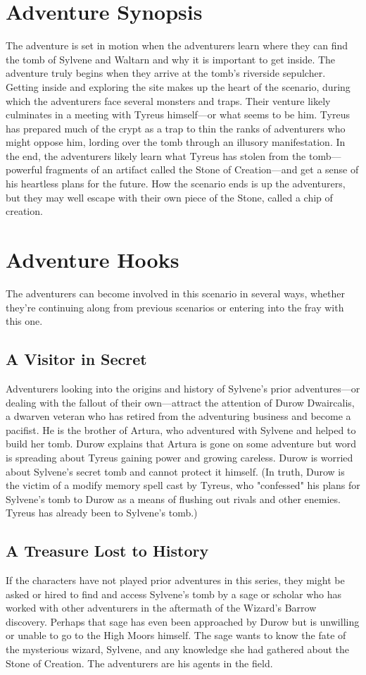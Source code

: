 \documentclass[10pt,a4paper,twoside,twocolumn,openany,bg=print,nodeprecatedcode]{dndbook}
\begin{document}
\section{Adventure Synopsis}
The adventure is set in motion when the adventurers learn where they can find the tomb of Sylvene and Waltarn and why it is important to get inside. The adventure truly begins when they arrive at the tomb's riverside sepulcher. Getting inside and exploring the site makes up the heart of the scenario, during which the adventurers face several monsters and traps. Their venture likely culminates in a meeting with Tyreus himself—or what seems to be him. Tyreus has prepared much of the crypt as a trap to thin the ranks of adventurers who might oppose him, lording over the tomb through an illusory manifestation. In the end, the adventurers likely learn what Tyreus has stolen from the tomb—powerful fragments of an artifact called the Stone of Creation—and get a sense of his heartless plans for the future.
How the scenario ends is up the adventurers, but they may well escape with their own piece of the Stone, called a chip of creation.
\section{Adventure Hooks}
The adventurers can become involved in this scenario in several ways, whether they're continuing along from previous scenarios or entering into the fray with this one.
\subsection{A Visitor in Secret}
Adventurers looking into the origins and history of Sylvene's prior adventures—or dealing with the fallout of their own—attract the attention of Durow Dwaircalis, a dwarven veteran who has retired from the adventuring business and become a pacifist. He is the brother of Artura, who adventured with Sylvene and helped to build her tomb. Durow explains that Artura is gone on some adventure but word is spreading about Tyreus gaining power and growing careless. Durow is worried about Sylvene's secret tomb and cannot protect it himself.
(In truth, Durow is the victim of a modify memory spell cast by Tyreus, who "confessed" his plans for Sylvene's tomb to Durow as a means of flushing out rivals and other enemies. Tyreus has already been to Sylvene's tomb.)
\subsection{A Treasure Lost to History}
If the characters have not played prior adventures in this series, they might be asked or hired to find and access Sylvene's tomb by a sage or scholar who has worked with other adventurers in the aftermath of the Wizard's Barrow discovery. Perhaps that sage has even been approached by Durow but is unwilling or unable to go to the High Moors himself. The sage wants to know the fate of the mysterious wizard, Sylvene, and any knowledge she had gathered about the Stone of Creation. The adventurers are his agents in the field.
\end{document}
